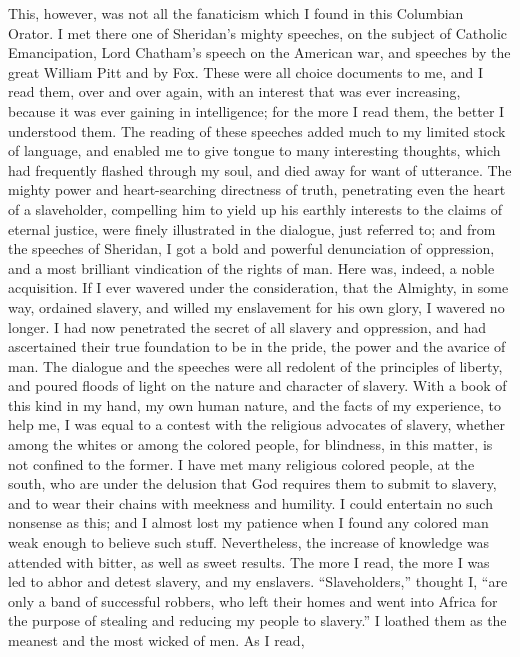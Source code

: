 This, however, was not all the fanaticism which I found in this
Columbian Orator. I met there one of Sheridan's mighty speeches, on the
subject of Catholic Emancipation, Lord Chatham's speech on the American
war, and speeches by the great William Pitt and by Fox. These were all
choice documents to me, and I read them, over and over again, with an
interest that was ever increasing, because it was ever gaining in
intelligence; for the more I read them, the better I understood them.
The reading of these speeches added much to my limited stock of
language, and enabled me to give tongue to many interesting thoughts,
which had frequently flashed through my soul, and died away for want of
utterance. The mighty power and heart-searching directness of truth,
penetrating even the heart of a slaveholder, compelling him to yield up
his earthly interests to the claims of eternal justice, were finely
illustrated in the dialogue, just referred to; and from the speeches of
Sheridan, I got a bold and powerful denunciation of oppression, and a
most brilliant vindication of the rights of man. Here was, indeed, a
noble acquisition. If I ever wavered under the consideration, that the
{\protect\hypertarget{159}{}{}}Almighty, in some way, ordained slavery,
and willed my enslavement for his own glory, I wavered no longer. I had
now penetrated the secret of all slavery and oppression, and had
ascertained their true foundation to be in the pride, the power and the
avarice of man. The dialogue and the speeches were all redolent of the
principles of liberty, and poured floods of light on the nature and
character of slavery. With a book of this kind in my hand, my own human
nature, and the facts of my experience, to help me, I was equal to a
contest with the religious advocates of slavery, whether among the
whites or among the colored people, for blindness, in this matter, is
not confined to the former. I have met many religious colored people, at
the south, who are under the delusion that God requires them to submit
to slavery, and to wear their chains with meekness and humility. I could
entertain no such nonsense as this; and I almost lost my patience when I
found any colored man weak enough to believe such stuff. Nevertheless,
the increase of knowledge was attended with bitter, as well as sweet
results. The more I read, the more I was led to abhor and detest
slavery, and my enslavers. ``Slaveholders,'' thought I, ``are only a
band of successful robbers, who left their homes and went into Africa
for the purpose of stealing and reducing my people to slavery.'' I
loathed them as the meanest and the most wicked of men. As I read,
